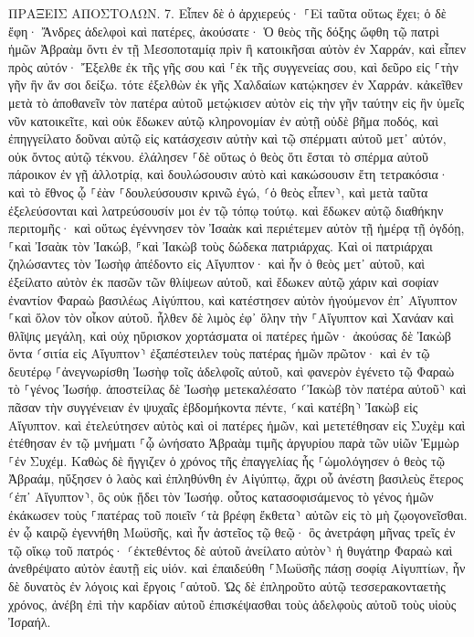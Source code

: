 \documentclass[twoside, 9pt]{extreport}
\begin{document}
ΠΡΑΞΕΙΣ ΑΠΟΣΤΟΛΩΝ.
7.
Εἶπεν δὲ ὁ ἀρχιερεύς· ⸀Εἰ ταῦτα οὕτως ἔχει; 
ὁ δὲ ἔφη· Ἄνδρες ἀδελφοὶ καὶ πατέρες, ἀκούσατε· Ὁ θεὸς τῆς δόξης ὤφθη τῷ πατρὶ ἡμῶν Ἀβραὰμ ὄντι ἐν τῇ Μεσοποταμίᾳ πρὶν ἢ κατοικῆσαι αὐτὸν ἐν Χαρράν, 
καὶ εἶπεν πρὸς αὐτόν· Ἔξελθε ἐκ τῆς γῆς σου καὶ ⸀ἐκ τῆς συγγενείας σου, καὶ δεῦρο εἰς ⸀τὴν γῆν ἣν ἄν σοι δείξω. 
τότε ἐξελθὼν ἐκ γῆς Χαλδαίων κατῴκησεν ἐν Χαρράν. κἀκεῖθεν μετὰ τὸ ἀποθανεῖν τὸν πατέρα αὐτοῦ μετῴκισεν αὐτὸν εἰς τὴν γῆν ταύτην εἰς ἣν ὑμεῖς νῦν κατοικεῖτε, 
καὶ οὐκ ἔδωκεν αὐτῷ κληρονομίαν ἐν αὐτῇ οὐδὲ βῆμα ποδός, καὶ ἐπηγγείλατο δοῦναι αὐτῷ εἰς κατάσχεσιν αὐτὴν καὶ τῷ σπέρματι αὐτοῦ μετ᾽ αὐτόν, οὐκ ὄντος αὐτῷ τέκνου. 
ἐλάλησεν ⸀δὲ οὕτως ὁ θεὸς ὅτι ἔσται τὸ σπέρμα αὐτοῦ πάροικον ἐν γῇ ἀλλοτρίᾳ, καὶ δουλώσουσιν αὐτὸ καὶ κακώσουσιν ἔτη τετρακόσια· 
καὶ τὸ ἔθνος ᾧ ⸀ἐὰν ⸀δουλεύσουσιν κρινῶ ἐγώ, ⸂ὁ θεὸς εἶπεν⸃, καὶ μετὰ ταῦτα ἐξελεύσονται καὶ λατρεύσουσίν μοι ἐν τῷ τόπῳ τούτῳ. 
καὶ ἔδωκεν αὐτῷ διαθήκην περιτομῆς· καὶ οὕτως ἐγέννησεν τὸν Ἰσαὰκ καὶ περιέτεμεν αὐτὸν τῇ ἡμέρᾳ τῇ ὀγδόῃ, ⸀καὶ Ἰσαὰκ τὸν Ἰακώβ, ⸁καὶ Ἰακὼβ τοὺς δώδεκα πατριάρχας. 
Καὶ οἱ πατριάρχαι ζηλώσαντες τὸν Ἰωσὴφ ἀπέδοντο εἰς Αἴγυπτον· καὶ ἦν ὁ θεὸς μετ᾽ αὐτοῦ, 
καὶ ἐξείλατο αὐτὸν ἐκ πασῶν τῶν θλίψεων αὐτοῦ, καὶ ἔδωκεν αὐτῷ χάριν καὶ σοφίαν ἐναντίον Φαραὼ βασιλέως Αἰγύπτου, καὶ κατέστησεν αὐτὸν ἡγούμενον ἐπ᾽ Αἴγυπτον ⸀καὶ ὅλον τὸν οἶκον αὐτοῦ. 
ἦλθεν δὲ λιμὸς ἐφ᾽ ὅλην τὴν ⸀Αἴγυπτον καὶ Χανάαν καὶ θλῖψις μεγάλη, καὶ οὐχ ηὕρισκον χορτάσματα οἱ πατέρες ἡμῶν· 
ἀκούσας δὲ Ἰακὼβ ὄντα ⸂σιτία εἰς Αἴγυπτον⸃ ἐξαπέστειλεν τοὺς πατέρας ἡμῶν πρῶτον· 
καὶ ἐν τῷ δευτέρῳ ⸀ἀνεγνωρίσθη Ἰωσὴφ τοῖς ἀδελφοῖς αὐτοῦ, καὶ φανερὸν ἐγένετο τῷ Φαραὼ τὸ ⸀γένος Ἰωσήφ. 
ἀποστείλας δὲ Ἰωσὴφ μετεκαλέσατο ⸂Ἰακὼβ τὸν πατέρα αὐτοῦ⸃ καὶ πᾶσαν τὴν συγγένειαν ἐν ψυχαῖς ἑβδομήκοντα πέντε, 
⸂καὶ κατέβη⸃ Ἰακὼβ εἰς Αἴγυπτον. καὶ ἐτελεύτησεν αὐτὸς καὶ οἱ πατέρες ἡμῶν, 
καὶ μετετέθησαν εἰς Συχὲμ καὶ ἐτέθησαν ἐν τῷ μνήματι ⸀ᾧ ὠνήσατο Ἀβραὰμ τιμῆς ἀργυρίου παρὰ τῶν υἱῶν Ἑμμὼρ ⸀ἐν Συχέμ. 
Καθὼς δὲ ἤγγιζεν ὁ χρόνος τῆς ἐπαγγελίας ἧς ⸀ὡμολόγησεν ὁ θεὸς τῷ Ἀβραάμ, ηὔξησεν ὁ λαὸς καὶ ἐπληθύνθη ἐν Αἰγύπτῳ, 
ἄχρι οὗ ἀνέστη βασιλεὺς ἕτερος ⸂ἐπ᾽ Αἴγυπτον⸃, ὃς οὐκ ᾔδει τὸν Ἰωσήφ. 
οὗτος κατασοφισάμενος τὸ γένος ἡμῶν ἐκάκωσεν τοὺς ⸀πατέρας τοῦ ποιεῖν ⸂τὰ βρέφη ἔκθετα⸃ αὐτῶν εἰς τὸ μὴ ζῳογονεῖσθαι. 
ἐν ᾧ καιρῷ ἐγεννήθη Μωϋσῆς, καὶ ἦν ἀστεῖος τῷ θεῷ· ὃς ἀνετράφη μῆνας τρεῖς ἐν τῷ οἴκῳ τοῦ πατρός· 
⸂ἐκτεθέντος δὲ αὐτοῦ ἀνείλατο αὐτὸν⸃ ἡ θυγάτηρ Φαραὼ καὶ ἀνεθρέψατο αὐτὸν ἑαυτῇ εἰς υἱόν. 
καὶ ἐπαιδεύθη ⸀Μωϋσῆς πάσῃ σοφίᾳ Αἰγυπτίων, ἦν δὲ δυνατὸς ἐν λόγοις καὶ ἔργοις ⸀αὐτοῦ. 
Ὡς δὲ ἐπληροῦτο αὐτῷ τεσσερακονταετὴς χρόνος, ἀνέβη ἐπὶ τὴν καρδίαν αὐτοῦ ἐπισκέψασθαι τοὺς ἀδελφοὺς αὐτοῦ τοὺς υἱοὺς Ἰσραήλ. 
\end{document}
